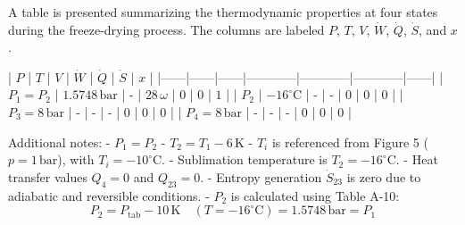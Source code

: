 A table is presented summarizing the thermodynamic properties at four states during the freeze-drying process. The columns are labeled \(P\), \(T\), \(V\), \(\dot{W}\), \(\dot{Q}\), \(\dot{S}\), and \(x\).  

| \(P\) | \(T\) | \(V\) | \(\dot{W}\) | \(\dot{Q}\) | \(\dot{S}\) | \(x\) |  
|------|------|------|------------|------------|------------|------|  
| \(P_1 = P_2\) | \(1.5748 \, \text{bar}\) | - | \(28 \, \omega\) | \(0\) | \(0\) | \(1\) |  
| \(P_2\) | \(-16^\circ \text{C}\) | - | - | \(0\) | \(0\) | \(0\) |  
| \(P_3 = 8 \, \text{bar}\) | - | - | - | \(0\) | \(0\) | \(0\) |  
| \(P_4 = 8 \, \text{bar}\) | - | - | - | \(0\) | \(0\) | \(0\) |  

Additional notes:  
- \(P_1 = P_2\)  
- \(T_2 = T_1 - 6 \, \text{K}\)  
- \(T_i\) is referenced from Figure 5 (\(p = 1 \, \text{bar}\)), with \(T_i = -10^\circ \text{C}\).  
- Sublimation temperature is \(T_2 = -16^\circ \text{C}\).  
- Heat transfer values \(Q_{4} = 0\) and \(Q_{23} = 0\).  
- Entropy generation \(\dot{S}_{23}\) is zero due to adiabatic and reversible conditions.  
- \(P_2\) is calculated using Table A-10:  
  \[
  P_2 = P_{\text{tab}} - 10 \, \text{K} \quad (T = -16^\circ \text{C}) = 1.5748 \, \text{bar} = P_1
  \]